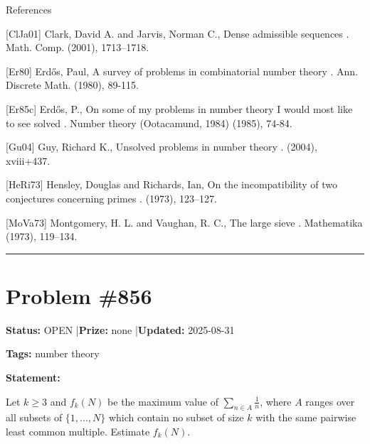 \documentclass{article}
\begin{document}
References

[ClJa01] Clark, David A. and Jarvis, Norman C., Dense admissible sequences . Math. Comp. (2001), 1713--1718.

[Er80] Erd\H{o}s, Paul, A survey of problems in combinatorial number theory . Ann. Discrete Math. (1980), 89-115.

[Er85c] Erd\H{o}s, P., On some of my problems in number theory I would most like to see solved . Number theory (Ootacamund, 1984) (1985), 74-84.

[Gu04] Guy, Richard K., Unsolved problems in number theory . (2004), xviii+437.

[HeRi73] Hensley, Douglas and Richards, Ian, On the incompatibility of two conjectures concerning primes . (1973), 123--127.

[MoVa73] Montgomery, H. L. and Vaughan, R. C., The large sieve . Mathematika (1973), 119--134.

\noindent\rule{\linewidth}{0.4pt}


\section{Problem \#856}
\label{prob:856}

\noindent\textbf{Status:} OPEN \quad|\quad \textbf{Prize:} none \quad|\quad \textbf{Updated:} 2025-08-31

\noindent\textbf{Tags:} number theory

\medskip

\noindent\textbf{Statement:}

Let $k\geq 3$ and $f_k(N)$ be the maximum value of $\sum_{n\in A}\frac{1}{n}$, where $A$ ranges over all subsets of $\{1,\ldots,N\}$ which contain no subset of size $k$ with the same pairwise least common multiple. Estimate $f_k(N)$.
\end{document}
